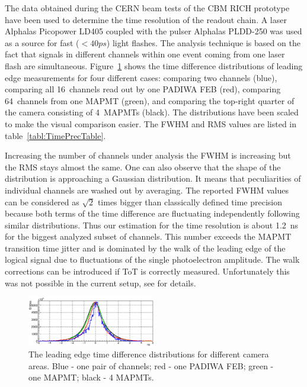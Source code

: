 \documentclass[final,5p,times,twocolumn]{elsarticle}
\begin{document}
The data obtained during the CERN beam tests of the CBM RICH prototype have been used to determine the time resolution of the readout chain. A laser Alphalas Picopower LD405 coupled with the pulser Alphalas PLDD-250 \cite{LASER} was used as a source for fast ($<40ps$) light flashes. The analysis technique is based on the fact that signals in different channels within one event coming from one laser flash are simultaneous. Figure~\ref{fig:TimePrec} shows the time difference distributions of leading edge measurements for four different cases: comparing two channels (blue), comparing all 16~channels read out by one PADIWA FEB (red), comparing 64~channels from one MAPMT (green), and comparing the top-right quarter of the camera consisting of 4~MAPMTs (black). The distributions have been scaled to make the visual comparison easier. The FWHM and RMS values are listed in table~\ref{tabl:TimePrecTable}.

Increasing the number of channels under analysis the FWHM is increasing but the RMS stays almost the same. One can also observe that the shape of the distribution is approaching a Gaussian distribution. It means that peculiarities of individual channels are washed out by averaging. The reported FWHM values can be considered as $ \sqrt 2 $ times bigger than classically defined time precision because both terms of the time difference are fluctuating independently following similar distributions. Thus our estimation for the time resolution is about 1.2~ns for the biggest analyzed subset of channels. This number exceeds the MAPMT transition time jitter and is dominated by the walk of the leading edge of the logical signal due to fluctuations of the single photoelectron amplitude. The walk corrections can be introduced if ToT is correctly measured. Unfortunately this was not possible in the current setup, see \cite{PEPAN} for details.

\begin{figure}[h]
	\centering
	\includegraphics[width=0.5\textwidth]{figures/TimePrecision_evolution_noStats2.eps}
	\caption{The leading edge time difference distributions for different camera areas. Blue - one pair of channels; red - one PADIWA FEB; green - one MAPMT; black - 4 MAPMTs.}
	\label{fig:TimePrec}
\end{figure}
\end{document}
